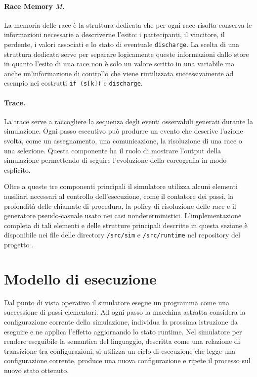 \paragraph{Race Memory $M$.}
La memoria delle race è la struttura dedicata che per ogni race risolta conserva le informazioni necessarie a descriverne l’esito: i partecipanti, il vincitore, il perdente, i valori associati e lo stato di eventuale \texttt{discharge}. La scelta di una struttura dedicata serve per separare logicamente queste informazioni dallo store in quanto l’esito di una race non è solo un valore scritto in una variabile ma anche un’informazione di controllo che viene riutilizzata successivamente ad esempio nei costrutti \texttt{if (s[k])} e \texttt{discharge}.

\paragraph{Trace.}
La trace serve a raccogliere la sequenza degli eventi osservabili generati durante la simulazione. Ogni passo esecutivo può produrre un evento che descrive l’azione svolta, come un assegnamento, una comunicazione, la risoluzione di una race o una selezione. Questa componente ha il ruolo di mostrare l’output della simulazione permettendo di seguire l’evoluzione della coreografia in modo esplicito.

\vspace{0.4cm}

\noindent
Oltre a queste tre componenti principali il simulatore utilizza alcuni elementi ausiliari necessari al controllo dell’esecuzione, come il contatore dei passi, la profondità delle chiamate di procedura, la policy di risoluzione delle race e il generatore pseudo-casuale usato nei casi nondeterministici. L’implementazione completa di tali elementi e delle strutture principali descritte in questa sezione è disponibile nei file delle directory \texttt{/src/sim} e \texttt{/src/runtime} nel repository del progetto \cite{rcparserrepo}.

\section{Modello di esecuzione}

Dal punto di vista operativo il simulatore esegue un programma come una successione di passi elementari. Ad ogni passo la macchina astratta considera la configurazione corrente della simulazione, individua la prossima istruzione da eseguire e ne applica l’effetto aggiornando lo stato runtime.
Nel simulatore per rendere eseguibile la semantica del linguaggio, descritta come una relazione di transizione tra configurazioni, si utilizza un ciclo di esecuzione che legge una configurazione corrente, produce una nuova configurazione e ripete il processo sul nuovo stato ottenuto.

